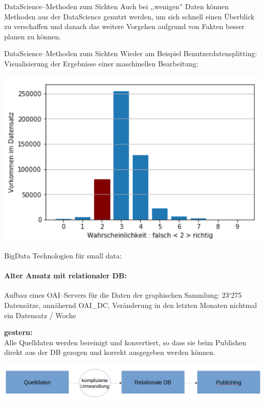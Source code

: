 \begin{frame}{DataScience--Methoden zum Sichten}
  Auch bei ,,wenigen'' Daten können Methoden aus der DataScience genutzt werden, um sich schnell einen Überblick zu verschaffen und danach das weitere Vorgehen aufgrund von Fakten besser planen zu können.
  
\end{frame}
\begin{frame}{DataScience--Methoden zum Sichten}
  Wieder am Beispiel Benutzerdatensplitting: Visualisierung der Ergebnisse einer maschinellen Bearbeitung:
  \begin{center}
    \includegraphics[width=1\textwidth]{pics/Auswertung_Splitting}
  \end{center}
  
\end{frame}


\begin{frame}{BigData Technologien für small data:}
  \framesubtitle{Alter Ansatz mit relationaler DB:}
  Aufbau eines OAI--Servers für die Daten der graphischen Sammlung: 23‘275 Datensätze, annähernd OAI_DC, Veränderung in den letzten Monaten nichtmal ein Datensatz / Woche

  \textbf{gestern:}\\
  Alle Quelldaten werden bereinigt und konvertiert, so dass sie beim Publishen direkt aus der DB gezogen und korrekt ausgegeben werden können.
  \begin{center}
    \includegraphics[width=1\textwidth]{pics/Ansatz-mit-rel-DB}
  \end{center}
  
\end{frame}

